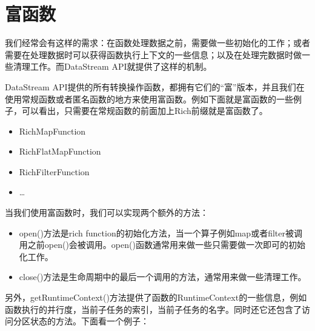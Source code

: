 \documentclass[cn,11pt,chinese]{elegantbook}
\providecommand{\tightlist}{%
  \setlength{\itemsep}{0pt}\setlength{\parskip}{0pt}}
\begin{document}
\hypertarget{ux5bccux51fdux6570}{%
\section{富函数}\label{ux5bccux51fdux6570}}

我们经常会有这样的需求：在函数处理数据之前，需要做一些初始化的工作；或者需要在处理数据时可以获得函数执行上下文的一些信息；以及在处理完数据时做一些清理工作。而DataStream
API就提供了这样的机制。

DataStream
API提供的所有转换操作函数，都拥有它们的``富''版本，并且我们在使用常规函数或者匿名函数的地方来使用富函数。例如下面就是富函数的一些例子，可以看出，只需要在常规函数的前面加上Rich前缀就是富函数了。

\begin{itemize}
\tightlist
\item
  RichMapFunction
\item
  RichFlatMapFunction
\item
  RichFilterFunction
\item
  \ldots{}
\end{itemize}

当我们使用富函数时，我们可以实现两个额外的方法：

\begin{itemize}
\tightlist
\item
  open()方法是rich
  function的初始化方法，当一个算子例如map或者filter被调用之前open()会被调用。open()函数通常用来做一些只需要做一次即可的初始化工作。
\item
  close()方法是生命周期中的最后一个调用的方法，通常用来做一些清理工作。
\end{itemize}

另外，getRuntimeContext()方法提供了函数的RuntimeContext的一些信息，例如函数执行的并行度，当前子任务的索引，当前子任务的名字。同时还它还包含了访问分区状态的方法。下面看一个例子：
\end{document}
